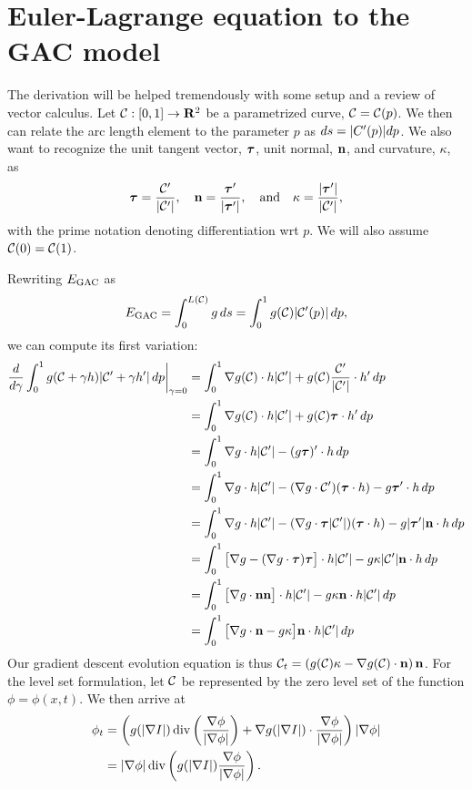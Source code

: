 \section{Euler-Lagrange equation to the GAC model}
The derivation will be helped tremendously with some setup and a review of vector calculus. Let $\mathcal{C}: [0,1]\rightarrow \mathbf{R}^2$ be a parametrized curve, $\mathcal{C} = \mathcal{C}(p)$. We then can relate the arc length element to the parameter $p$ as $ds = \lvert C'(p)\rvert dp$. We also want to recognize the unit tangent vector, $\boldsymbol{\tau}$, unit normal, $\mathbf{n}$, and curvature, $\kappa$, as 
\begin{align*}
\boldsymbol{\tau} 
= \frac{\mathcal{C}'}{\lvert\mathcal{C}'\rvert},\quad 
\mathbf{n} 
= \frac{ \boldsymbol{\tau} '}{\lvert\boldsymbol{\tau}'\rvert},
\quad\text{and}\quad 
\kappa = \frac{ \lvert\boldsymbol{\tau}'\rvert }{ \lvert \mathcal{C}' \rvert },
\end{align*}
with the prime notation denoting differentiation wrt $p$. We will also assume $\mathcal{C}(0) = \mathcal{C}(1)$. 

Rewriting $E_\textrm{GAC}$ as 
\begin{align*}
E_\textrm{GAC} = \int^{L(\mathcal{C})}_0 g \, ds 
= \int^1_0 g(\mathcal{C}) \lvert\mathcal{C}'(p)\rvert \, dp ,
\end{align*} 
we can compute its first variation: 
\begin{align*}
\frac{d}{d\gamma} \int^1_0 g(\mathcal{C} + \gamma h) \lvert\mathcal{C}' + \gamma h'\rvert \, dp \bigg\rvert_{\gamma = 0}
&=  \int^1_0 \nabla g(\mathcal{C}) \cdot h \lvert\mathcal{C}'\rvert + g(\mathcal{C}) \frac{\mathcal{C}'}{\lvert\mathcal{C}'\rvert} \cdot h' \,dp 
\\
&=\int^1_0 \nabla g(\mathcal{C}) \cdot h \lvert\mathcal{C}'\rvert + g(\mathcal{C}) \boldsymbol{\tau} \cdot h' \,dp 
\\
&=\int^1_0 \nabla g \cdot h \lvert\mathcal{C}'\rvert - ( g \boldsymbol{\tau})' \cdot h \, dp
\\
&=\int^1_0 \nabla g \cdot h \lvert\mathcal{C}'\rvert - (\nabla g \cdot \mathcal{C}')(\boldsymbol{\tau} \cdot h) - g\boldsymbol{\tau} ' \cdot h \, dp
\\
&=\int^1_0 \nabla g \cdot h \lvert\mathcal{C}'\rvert - (\nabla g \cdot \boldsymbol{\tau} \lvert\mathcal{C}'\rvert )(\boldsymbol{\tau} \cdot h) - g\lvert\boldsymbol{\tau}'\rvert \mathbf{n} \cdot h \, dp
\\
&=\int^1_0 \big[ \nabla g  - (\nabla g \cdot \boldsymbol{\tau} )\boldsymbol{\tau} \big] \cdot h \lvert\mathcal{C}'\rvert - g\kappa \lvert\mathcal{C}'\rvert \mathbf{n} \cdot h \, dp
\\
&=\int^1_0 \big[\nabla g \cdot \mathbf{n} \mathbf{n} \big] \cdot h \lvert\mathcal{C}'\rvert - g\kappa  \mathbf{n} \cdot h \lvert\mathcal{C}'\rvert \, dp
\\
&=\int^1_0 \big[ \nabla g \cdot \mathbf{n} - g\kappa \big] \mathbf{n}  \cdot h \lvert\mathcal{C}'\rvert \, dp
\\ 
\end{align*}
Our gradient descent evolution equation is thus $\mathcal{C}_t = \left( g(\mathcal{C}) \kappa - \nabla g(\mathcal{C}) \cdot \mathbf{n} \right) \mathbf{n} $.
For the level set formulation, let $\mathcal{C}$ be represented by the zero level set of the function $\phi = \phi(x, t)$. We then arrive at 
\begin{align*}
\phi_t 
&= \left(
g( \lvert\nabla I \rvert ) \operatorname{div}\left( \frac{\nabla \phi}{\lvert\nabla \phi\rvert} \right)
	+  \nabla g(  \lvert\nabla I \rvert )\cdot  \frac{\nabla \phi}{\lvert\nabla \phi\rvert}
\right) \lvert \nabla \phi \rvert
\\
&= \lvert\nabla \phi\rvert \operatorname{div}\left( 
g(  \lvert\nabla I \rvert ) \frac{\nabla \phi}{\lvert\nabla \phi\rvert}
\right) .
\end{align*}


